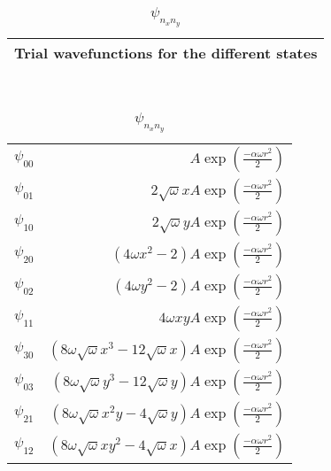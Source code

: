 \begin{table}[H]\caption{$\psi_{n_xn_y}$}\label{tab:single_particle_trial_wavefunctions}
\begin{tabular}{l}
Trial wavefunctions for the different states\\ \hline
\end{tabular}\\
\begin{tabular}{l|r}
\large $\psi_{00}$ & \large $A\exp\left({\frac{-\alpha\omega r^2}{2}}\right)$\\
\large $\psi_{01}$ & \large $2\sqrt{\omega}xA\exp\left({\frac{-\alpha\omega r^2}{2}}\right)$\\
\large $\psi_{10}$ & \large $2\sqrt{\omega}yA\exp\left({\frac{-\alpha\omega r^2}{2}}\right)$\\
\large $\psi_{20}$ & \large $(4\omega x^2-2)A\exp\left({\frac{-\alpha\omega r^2}{2}}\right)$\\
\large $\psi_{02}$ & \large $(4\omega y^2-2)A\exp\left({\frac{-\alpha\omega r^2}{2}}\right)$\\
\large $\psi_{11}$ & \large $4\omega xyA\exp\left({\frac{-\alpha\omega r^2}{2}}\right)$\\
\large $\psi_{30}$ & \large $(8\omega\sqrt{\omega}x^3 - 12\sqrt{\omega}x)A\exp\left({\frac{-\alpha\omega r^2}{2}}\right)$\\
\large $\psi_{03}$ & \large $(8\omega\sqrt{\omega}y^3 - 12\sqrt{\omega}y)A\exp\left({\frac{-\alpha\omega r^2}{2}}\right)$\\
\large $\psi_{21}$ & \large $(8\omega\sqrt{\omega} x^2y-4\sqrt{\omega}y)A\exp\left({\frac{-\alpha\omega r^2}{2}}\right)$\\
\large $\psi_{12}$ & \large $(8\omega\sqrt{\omega} xy^2-4\sqrt{\omega}x)A\exp\left({\frac{-\alpha\omega r^2}{2}}\right)$\\
\end{tabular}
\end{table}




